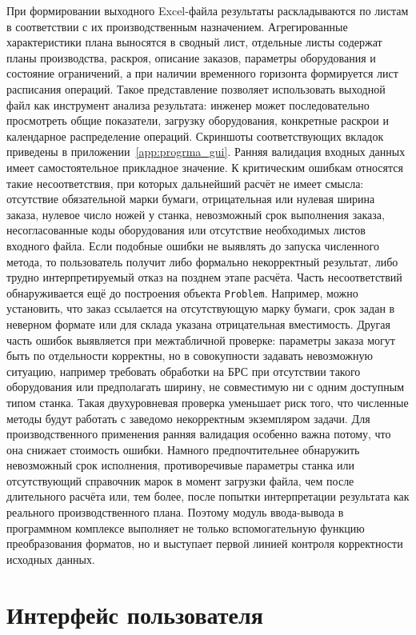 При формировании выходного Excel-файла результаты раскладываются по листам в соответствии с их производственным назначением. Агрегированные характеристики плана выносятся в сводный лист, отдельные листы содержат планы производства, раскроя, описание заказов, параметры оборудования и состояние ограничений, а при наличии временного горизонта формируется лист расписания операций. Такое представление позволяет использовать выходной файл как инструмент анализа результата: инженер может последовательно просмотреть общие показатели, загрузку оборудования, конкретные раскрои и календарное распределение операций. Скриншоты соответствующих вкладок приведены в приложении~\ref{app:progrma_gui}.
Ранняя валидация входных данных имеет самостоятельное прикладное значение. К критическим ошибкам относятся такие несоответствия, при которых дальнейший расчёт не имеет смысла: отсутствие обязательной марки бумаги, отрицательная или нулевая ширина заказа, нулевое число ножей у станка, невозможный срок выполнения заказа, несогласованные коды оборудования или отсутствие необходимых листов входного файла. Если подобные ошибки не выявлять до запуска численного метода, то пользователь получит либо формально некорректный результат, либо трудно интерпретируемый отказ на позднем этапе расчёта.
Часть несоответствий обнаруживается ещё до построения объекта \texttt{Problem}. Например, можно установить, что заказ ссылается на отсутствующую марку бумаги, срок задан в неверном формате или для склада указана отрицательная вместимость. Другая часть ошибок выявляется при межтабличной проверке: параметры заказа могут быть по отдельности корректны, но в совокупности задавать невозможную ситуацию, например требовать обработки на БРС при отсутствии такого оборудования или предполагать ширину, не совместимую ни с одним доступным типом станка. Такая двухуровневая проверка уменьшает риск того, что численные методы будут работать с заведомо некорректным экземпляром задачи.
Для производственного применения ранняя валидация особенно важна потому, что она снижает стоимость ошибки. Намного предпочтительнее обнаружить невозможный срок исполнения, противоречивые параметры станка или отсутствующий справочник марок в момент загрузки файла, чем после длительного расчёта или, тем более, после попытки интерпретации результата как реального производственного плана. Поэтому модуль ввода-вывода в программном комплексе выполняет не только вспомогательную функцию преобразования форматов, но и выступает первой линией контроля корректности исходных данных.

\section{Интерфейс пользователя}\label{sec:software/ui}

